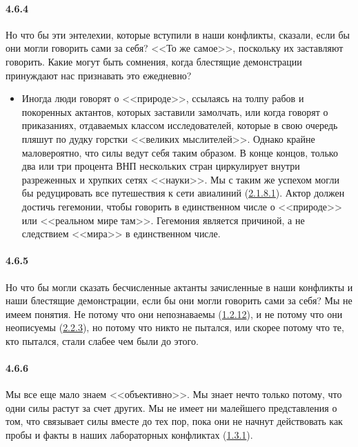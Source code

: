 \paragraph{4.6.4}\hypertarget{par:4.6.4}{} Но что бы эти энтелехии, которые вступили в наши конфликты, сказали, если бы они могли говорить {сами за себя}? <<То же самое>>, поскольку их заставляют говорить. Какие могут быть сомнения, когда блестящие демонстрации принуждают нас признавать это ежедневно? 
	\begin{itemize}
	\item 
	Иногда люди говорят о <<природе>>, ссылаясь на толпу рабов и покоренных актантов, которых заставили замолчать, или когда говорят о приказаниях, отдаваемых классом исследователей, которые в свою очередь пляшут по дудку горстки <<великих мыслителей>>. Однако крайне маловероятно, что силы ведут себя таким образом. В конце концов, только два или три процента ВНП нескольких стран циркулирует внутри разреженных и хрупких сетях <<науки>>. Мы с таким же успехом могли бы редуцировать все путешествия к сети авиалиний (\hyperlink{par:2.1.8.1}{2.1.8.1}). Актор должен достичь гегемонии, чтобы говорить в единственном числе о <<природе>> или <<реальном мире там>>. Гегемония является причиной, а не следствием <<мира>> в единственном числе.
	\end{itemize}

\paragraph{4.6.5}\hypertarget{par:4.6.5}{} Но что бы могли сказать бесчисленные актанты зачисленные в наши конфликты и наши блестящие демонстрации, если бы они могли говорить сами за себя? Мы не имеем понятия. Не потому что они непознаваемы (\hyperlink{par:1.2.12}{1.2.12}), и не потому что они неописуемы (\hyperlink{par:2.2.3}{2.2.3}), но потому что никто не пытался, или скорее потому что те, кто пытался, стали слабее чем были до этого.


\paragraph{4.6.6}\hypertarget{par:4.6.6}{} Мы все еще мало знаем <<объективно>>. Мы знает нечто только потому, что одни силы растут за счет других. Мы не имеет ни малейшего представления о том, что связывает силы вместе до тех пор, пока они не начнут действовать как пробы и факты в наших лабораторных конфликтах (\hyperlink{par:1.3.1}{1.3.1}).


